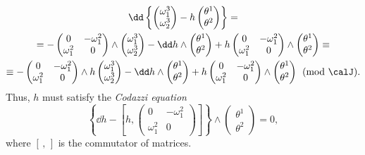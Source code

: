 \begin{multline}
    \dd \left\{
        \begin{pmatrix}
            \omega_1^3\\\omega_2^3
        \end{pmatrix}
        -h 
        \begin{pmatrix}
            \theta^1\\\theta^2
        \end{pmatrix}
    \right\}=\\
    =-\begin{pmatrix}
        0&-\omega_1^2\\
        \omega_1^2& 0
    \end{pmatrix}\wedge 
    \begin{pmatrix}
        \omega_1^3\\\omega_2^3
    \end{pmatrix}
    -\dd h\wedge 
    \begin{pmatrix}
        \theta^1\\\theta^2
    \end{pmatrix}
    +h \begin{pmatrix}
        0&-\omega_1^2\\
        \omega_1^2& 0
    \end{pmatrix}\wedge 
    \begin{pmatrix}
        \theta^1\\\theta^2
    \end{pmatrix} \equiv 
    \\
    \equiv
    -\begin{pmatrix}
        0&-\omega_1^2\\
        \omega_1^2& 0
    \end{pmatrix}\wedge h
    \begin{pmatrix}
        \omega_1^3\\\omega_2^3
    \end{pmatrix}
    -\dd h\wedge 
    \begin{pmatrix}
        \theta^1\\\theta^2
    \end{pmatrix}
    +h \begin{pmatrix}
        0&-\omega_1^2\\
        \omega_1^2& 0
    \end{pmatrix}\wedge 
    \begin{pmatrix}
        \theta^1\\\theta^2
    \end{pmatrix}\pmod{\calJ}.
\end{multline}
Thus, $h$ must satisfy the \emph{Codazzi equation} 
\[\left\{\dd h-\left[h,
\begin{pmatrix}
    0 & -\omega_1^2\\
    \omega_1^2 & 0
\end{pmatrix}
\right]\right\} \wedge 
\begin{pmatrix}
    \theta^1\\\theta^2
\end{pmatrix}=0,\label{eq Gauss-Codazzi}
\]
where $[\,,\,]$ is the commutator of matrices. 

